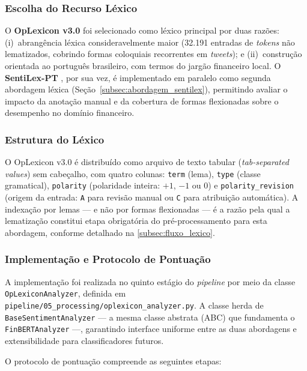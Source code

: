 \subsubsection{Escolha do Recurso Léxico}
\label{subsubsec:escolha_lexico}

O \textbf{OpLexicon v3.0} foi selecionado como léxico principal por duas razões: (i)~abrangência léxica consideravelmente maior (32.191 entradas de \textit{tokens} não lematizados, cobrindo formas coloquiais recorrentes em \textit{tweets}); e (ii)~construção orientada ao português brasileiro, com termos do jargão financeiro local. O \textbf{SentiLex-PT} \cite{silva2012sentilex}, por sua vez, é implementado em paralelo como segunda abordagem léxica (Seção~\ref{subsec:abordagem_sentilex}),  permitindo avaliar o impacto da anotação manual e da cobertura de formas flexionadas sobre o desempenho no domínio financeiro.


\subsubsection{Estrutura do Léxico}
\label{subsubsec:estrutura_lexico}

O OpLexicon v3.0 é distribuído como arquivo de texto tabular (\textit{tab-separated values}) sem cabeçalho, com quatro colunas: \texttt{term} (lema), \texttt{type} (classe gramatical), \texttt{polarity} (polaridade inteira: $+1$, $-1$ ou $0$) e \texttt{polarity\_revision} (origem da entrada: \texttt{A} para revisão manual ou \texttt{C} para atribuição automática). A indexação por lemas — e não por formas flexionadas — é a razão pela qual a lematização constitui etapa obrigatória do pré-processamento para esta abordagem, conforme detalhado na \autoref{subsec:fluxo_lexico}.

\subsubsection{Implementação e Protocolo de Pontuação}
\label{subsubsec:protocolo_oplexicon}

A implementação foi realizada no quinto estágio do \textit{pipeline} por meio da classe \texttt{OpLexiconAnalyzer}, definida em \texttt{pipeline/05\_processing/oplexicon\_analyzer.py}. A classe herda de \texttt{BaseSentimentAnalyzer} — a mesma classe abstrata (ABC) que fundamenta o
\texttt{FinBERTAnalyzer} —, garantindo interface uniforme entre as duas abordagens e extensibilidade para classificadores futuros.

O protocolo de pontuação compreende as seguintes etapas:

